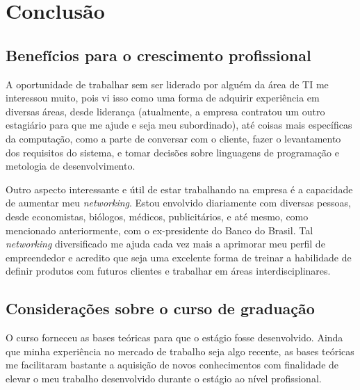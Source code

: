 \chapter{Conclusão}
\label{chap:conclusao}

\section{Benefícios para o crescimento profissional}

A oportunidade de trabalhar sem ser liderado por alguém da área de TI me interessou muito, pois vi isso como uma 
forma de adquirir experiência em diversas áreas, desde liderança (atualmente, a empresa contratou um outro estagiário para que me
ajude e seja meu subordinado), até coisas mais específicas da computação, como a parte de conversar com o cliente,
fazer o levantamento dos requisitos do sistema, e tomar decisões sobre linguagens de programação e metologia de desenvolvimento.

Outro aspecto interessante e útil de estar trabalhando na empresa é a capacidade de aumentar meu \textit{networking}.
Estou envolvido diariamente com diversas pessoas, desde economistas, biólogos, médicos, publicitários, e até mesmo, como mencionado
anteriormente, com o ex-presidente do Banco do Brasil. Tal \textit{networking} diversificado me ajuda cada vez mais a aprimorar 
meu perfil de empreendedor e acredito que seja uma excelente forma de treinar a habilidade de definir produtos com futuros clientes
e trabalhar em áreas interdisciplinares.




\section{Considerações sobre o curso de graduação}

O curso forneceu as bases teóricas para que o estágio fosse desenvolvido. Ainda que minha experiência no mercado de trabalho seja algo recente, 
as bases teóricas me facilitaram bastante a aquisição de novos conhecimentos com finalidade de elevar o meu trabalho desenvolvido 
durante o estágio ao nível profissional.




